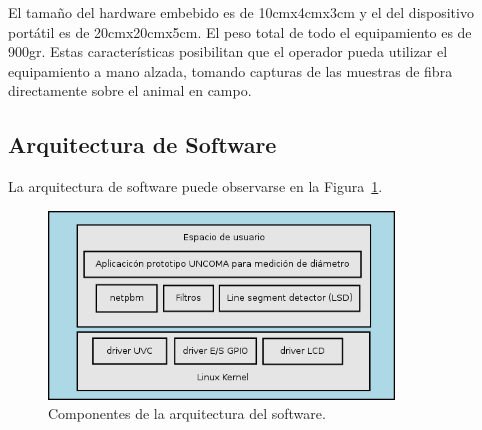 \documentclass[runningheads,a4paper]{llncs}
\begin{document}
El tamaño del hardware embebido es de 10cmx4cmx3cm y el del dispositivo portátil es de 20cmx20cmx5cm. El peso total de todo el equipamiento es de 900gr. Estas características posibilitan que el operador pueda utilizar el equipamiento a mano alzada, tomando capturas de las muestras de fibra directamente sobre el animal en campo.


\subsection{Arquitectura de Software}


La arquitectura de software puede observarse en la Figura~\ref{fig:arqsoft}.
\begin{figure}
\centering
\includegraphics[height=5cm]{arqsoft}
\caption{Componentes de la arquitectura del software.}
\label{fig:arqsoft}
\end{figure}
\end{document}
